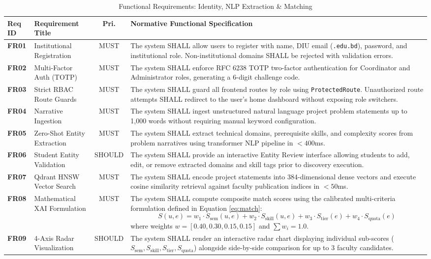 \documentclass[10.5pt,a4paper]{article}
\begin{document}
\begin{table}[h]
\centering
\small
\begin{tabularx}{\linewidth}{|l|l|c|X|}
\hline
\rowcolor{headergray} \textbf{Req ID} & \textbf{Requirement Title} & \textbf{Pri.} & \textbf{Normative Functional Specification} \\ \hline
\textbf{FR01} & Institutional Registration & MUST & The system SHALL allow users to register with name, DIU email (\texttt{.edu.bd}), password, and institutional role. Non-institutional domains SHALL be rejected with validation errors. \\ \hline
\textbf{FR02} & Multi-Factor Auth (TOTP) & MUST & The system SHALL enforce RFC 6238 TOTP two-factor authentication for Coordinator and Administrator roles, generating a 6-digit challenge code. \\ \hline
\textbf{FR03} & Strict RBAC Route Guards & MUST & The system SHALL guard all frontend routes by role using \texttt{ProtectedRoute}. Unauthorized route attempts SHALL redirect to the user's home dashboard without exposing role switchers. \\ \hline
\textbf{FR04} & Narrative Ingestion & MUST & The system SHALL ingest unstructured natural language project problem statements up to 1,000 words without requiring manual keyword configuration. \\ \hline
\textbf{FR05} & Zero-Shot Entity Extraction & MUST & The system SHALL extract technical domains, prerequisite skills, and complexity scores from problem narratives using transformer NLP pipeline in $< 400$ms. \\ \hline
\textbf{FR06} & Student Entity Validation & SHOULD & The system SHALL provide an interactive Entity Review interface allowing students to add, edit, or remove extracted domains and skill tags prior to discovery execution. \\ \hline
\textbf{FR07} & Qdrant HNSW Vector Search & MUST & The system SHALL encode project statements into 384-dimensional dense vectors and execute cosine similarity retrieval against faculty publication indices in $< 50$ms. \\ \hline
\textbf{FR08} & Mathematical XAI Formulation & MUST & The system SHALL compute composite match scores using the calibrated multi-criteria formulation defined in Equation \ref{eq:match}:
\begin{equation}
S(u, e) = w_1 \cdot S_{\text{sem}}(u, e) + w_2 \cdot S_{\text{skill}}(u, e) + w_3 \cdot S_{\text{tier}}(e) + w_4 \cdot S_{\text{quota}}(e)
\label{eq:match}
\end{equation}
where weights $w = [0.40, 0.30, 0.15, 0.15]$ and $\sum w_i = 1.0$. \\ \hline
\textbf{FR09} & 4-Axis Radar Visualization & SHOULD & The system SHALL render an interactive radar chart displaying individual sub-scores ($S_{\text{sem}}, S_{\text{skill}}, S_{\text{tier}}, S_{\text{quota}}$) alongside side-by-side comparison for up to 3 faculty candidates. \\ \hline
\end{tabularx}
\caption{Functional Requirements: Identity, NLP Extraction \& Matching}
\label{tab:fr_part1}
\end{table}
\end{document}
